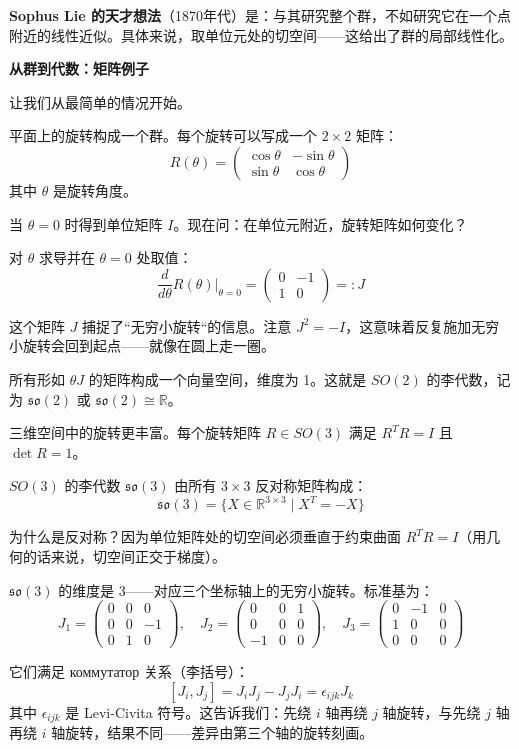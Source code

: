 \textbf{Sophus Lie 的天才想法}（1870年代）是：与其研究整个群，不如研究它在一个点附近的线性近似。具体来说，取单位元处的切空间——这给出了群的局部线性化。

\bigskip
\noindent\textbf{从群到代数：矩阵例子}

让我们从最简单的情况开始。

\begin{Example}[二维旋转群 $SO(2)$]
平面上的旋转构成一个群。每个旋转可以写成一个 $2 \times 2$ 矩阵：
$$R(\theta) = \begin{pmatrix} \cos\theta & -\sin\theta \\ \sin\theta & \cos\theta \end{pmatrix}$$
其中 $\theta$ 是旋转角度。

当 $\theta = 0$ 时得到单位矩阵 $I$。现在问：在单位元附近，旋转矩阵如何变化？

对 $\theta$ 求导并在 $\theta = 0$ 处取值：
$$\frac{d}{d\theta}R(\theta)\Big|_{\theta=0} = \begin{pmatrix} 0 & -1 \\ 1 & 0 \end{pmatrix} =: J$$

这个矩阵 $J$ 捕捉了``无穷小旋转``的信息。注意 $J^2 = -I$，这意味着反复施加无穷小旋转会回到起点——就像在圆上走一圈。

所有形如 $\theta J$ 的矩阵构成一个向量空间，维度为 1。这就是 $SO(2)$ 的李代数，记为 $\mathfrak{so}(2)$ 或 $\mathfrak{so}(2) \cong \mathbb{R}$。
\end{Example}

\begin{Example}[三维旋转群 $SO(3)$]
三维空间中的旋转更丰富。每个旋转矩阵 $R \in SO(3)$ 满足 $R^T R = I$ 且 $\det R = 1$。

$SO(3)$ 的李代数 $\mathfrak{so}(3)$ 由所有 $3 \times 3$ 反对称矩阵构成：
$$\mathfrak{so}(3) = \{X \in \mathbb{R}^{3\times 3} \mid X^T = -X\}$$

为什么是反对称？因为单位矩阵处的切空间必须垂直于约束曲面 $R^T R = I$（用几何的话来说，切空间正交于梯度）。

$\mathfrak{so}(3)$ 的维度是 3——对应三个坐标轴上的无穷小旋转。标准基为：
$$J_1 = \begin{pmatrix} 0 & 0 & 0 \\ 0 & 0 & -1 \\ 0 & 1 & 0 \end{pmatrix}, \quad J_2 = \begin{pmatrix} 0 & 0 & 1 \\ 0 & 0 & 0 \\ -1 & 0 & 0 \end{pmatrix}, \quad J_3 = \begin{pmatrix} 0 & -1 & 0 \\ 1 & 0 & 0 \\ 0 & 0 & 0 \end{pmatrix}$$

它们满足 коммутатор 关系（李括号）：
$$[J_i, J_j] = J_i J_j - J_j J_i = \epsilon_{ijk} J_k$$
其中 $\epsilon_{ijk}$ 是 Levi-Civita 符号。这告诉我们：先绕 $i$ 轴再绕 $j$ 轴旋转，与先绕 $j$ 轴再绕 $i$ 轴旋转，结果不同——差异由第三个轴的旋转刻画。
\end{Example}

